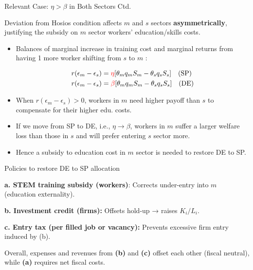 \documentclass[9pt,xcolor={svgnames}]{beamer}
\begin{document}
\begin{frame}{Relevant Case: $\eta > \beta$ in Both Sectors Ctd.}

Deviation from Hosios condition affects $m$ and $s$ sectors \textbf{asymmetrically},  justifying the subsidy on $m$ sector workers' education/skills costs.\\

\vspace{5mm}

\begin{itemize}



    \item Balances of marginal increase in training cost and marginal returns from having 1 more worker shifting from $s$ to $m$ : 

    \begin{align*}
        r(\epsilon_m-\epsilon_s) &= \textcolor{red}{\eta} [\theta_mq_mS_m - \theta_sq_sS_s] \quad \text{(SP)}\\
         r(\epsilon_m-\epsilon_s) &= \textcolor{red}{\beta} [\theta_mq_mS_m - \theta_sq_sS_s]  \quad \text{(DE)}\\
    \end{align*}


    \item When $r(\epsilon_m -\epsilon_s)>0$, workers in $m$ need higher payoff than $s$ to compensate for their higher edu. costs. 

    \item If we move from SP to DE, i.e., $\eta \rightarrow \beta$, workers in $m$ suffer a larger welfare loss than those in $s$ and will prefer entering $s$ sector more.  

    \item Hence a subsidy to education cost in $m$ sector is needed to restore DE to SP.
\end{itemize}
\end{frame}




\begin{frame}{Policies to restore DE to SP allocation}
\small

\textbf{a. STEM training subsidy (workers)}: Corrects under-entry into $m$ (education externality).
\medskip

\textbf{b. Investment credit (firms):} Offsets hold-up → raises $K_i/L_i$.

\medskip

\textbf{c. Entry tax (per filled job or vacancy):} Prevents excessive firm entry induced by (b).

\medskip

\medskip 

Overall, expenses and revenues from \textbf{(b)} and \textbf{(c)}  offset each other (fiscal neutral), while \textbf{(a)} requires net fiscal costs.

\medskip

\end{frame}
\end{document}
